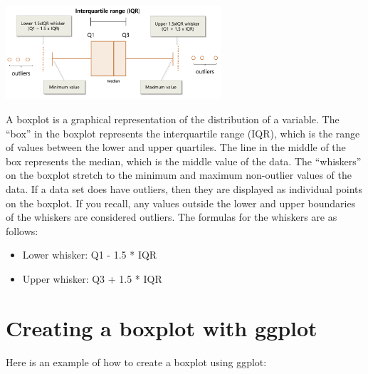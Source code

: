\documentclass[
  letterpaper,
  DIV=11,
  numbers=noendperiod]{scrreprt}
\providecommand{\tightlist}{%
  \setlength{\itemsep}{0pt}\setlength{\parskip}{0pt}}\usepackage{longtable,booktabs,array}
\begin{document}

\includegraphics[width=0.6\textwidth,height=\textheight]{./images/ABT_1.jpg}

A boxplot is a graphical representation of the distribution of a
variable. The ``box'' in the boxplot represents the interquartile range
(IQR), which is the range of values between the lower and upper
quartiles. The line in the middle of the box represents the median,
which is the middle value of the data. The ``whiskers'' on the boxplot
stretch to the minimum and maximum non-outlier values of the data. If a
data set does have outliers, then they are displayed as individual
points on the boxplot. If you recall, any values outside the lower and
upper boundaries of the whiskers are considered outliers. The formulas
for the whiskers are as follows:

\begin{itemize}
\tightlist
\item
  Lower whisker: Q1 - 1.5 * IQR
\item
  Upper whisker: Q3 + 1.5 * IQR
\end{itemize}

\section*{Creating a boxplot with
ggplot}\label{creating-a-boxplot-with-ggplot}


Here is an example of how to create a boxplot using ggplot:
\end{document}
